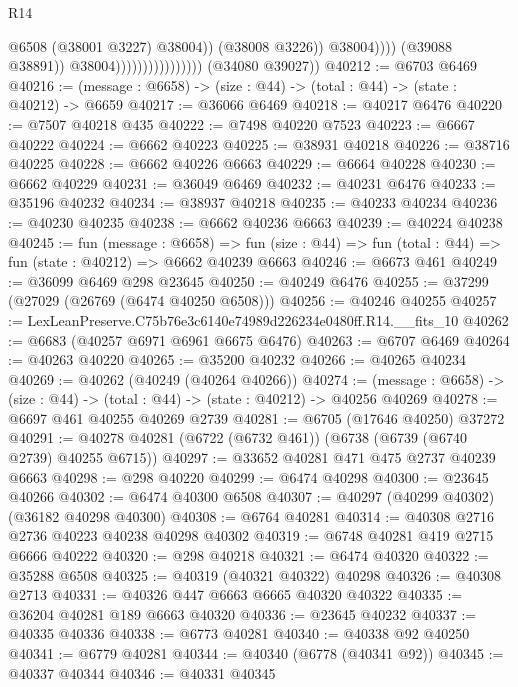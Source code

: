 \begin{lexlean}{R14}
\begin{coremodule}
                                                      @6508
                                                      (@38001 @3227)
                                                      @38004))
                                                  (@38008 @3226))
                                                @38004))))
                                        (@39088 @38891))
                                      @38004))))))))))))))))
      (@34080 @39027))
@40212 := @6703 @6469
@40216 := (message : @6658) -> (size : @44) -> (total : @44) -> (state : @40212) -> @6659
@40217 := @36066 @6469
@40218 := @40217 @6476
@40220 := @7507 @40218 @435
@40222 := @7498 @40220 @7523
@40223 := @6667 @40222
@40224 := @6662 @40223
@40225 := @38931 @40218
@40226 := @38716 @40225
@40228 := @6662 @40226 @6663
@40229 := @6664 @40228
@40230 := @6662 @40229
@40231 := @36049 @6469
@40232 := @40231 @6476
@40233 := @35196 @40232
@40234 := @38937 @40218
@40235 := @40233 @40234
@40236 := @40230 @40235
@40238 := @6662 @40236 @6663
@40239 := @40224 @40238
@40245 := fun (message : @6658) =>
  fun (size : @44) => fun (total : @44) => fun (state : @40212) => @6662 @40239 @6663
@40246 := @6673 @461
@40249 := @36099 @6469 @298 @23645
@40250 := @40249 @6476
@40255 := @37299 (@27029 (@26769 (@6474 @40250 @6508)))
@40256 := @40246 @40255
@40257 := LexLeanPreserve.C75b76e3c6140e74989d226234e0480ff.R14.__fits_10
@40262 := @6683 (@40257 @6971 @6961 @6675 @6476)
@40263 := @6707 @6469
@40264 := @40263 @40220
@40265 := @35200 @40232
@40266 := @40265 @40234
@40269 := @40262 (@40249 (@40264 @40266))
@40274 := (message : @6658) -> (size : @44) -> (total : @44) -> (state : @40212) -> @40256 @40269
@40278 := @6697 @461 @40255 @40269 @2739
@40281 := @6705 (@17646 @40250) @37272
@40291 := @40278 @40281 (@6722 (@6732 @461)) (@6738 (@6739 (@6740 @2739) @40255 @6715))
@40297 := @33652 @40281 @471 @475 @2737 @40239 @6663
@40298 := @298 @40220
@40299 := @6474 @40298
@40300 := @23645 @40266
@40302 := @6474 @40300 @6508
@40307 := @40297 (@40299 @40302) (@36182 @40298 @40300)
@40308 := @6764 @40281
@40314 := @40308 @2716 @2736 @40223 @40238 @40298 @40302
@40319 := @6748 @40281 @419 @2715 @6666 @40222
@40320 := @298 @40218
@40321 := @6474 @40320
@40322 := @35288 @6508
@40325 := @40319 (@40321 @40322) @40298
@40326 := @40308 @2713
@40331 := @40326 @447 @6663 @6665 @40320 @40322
@40335 := @36204 @40281 @189 @6663 @40320
@40336 := @23645 @40232
@40337 := @40335 @40336
@40338 := @6773 @40281
@40340 := @40338 @92 @40250
@40341 := @6779 @40281
@40344 := @40340 (@6778 (@40341 @92))
@40345 := @40337 @40344
@40346 := @40331 @40345

\end{coremodule}
\end{lexlean}
